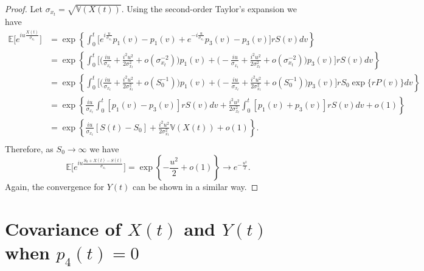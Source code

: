 \documentclass[10pt]{article}
\newcommand{\Var}{\mathbb{V}}
\newcommand{\EE}{\mathbb{E}}
\begin{document}
\begin{proof}
Let $\sigma_{x_t} = \sqrt{\Var(X(t))}$. Using the second-order Taylor's expansion we have
\begin{equation*}
\begin{split}
\EE \Big[e^{iu \frac{X(t)}{\sigma_{x_t}}} \Big] &= \exp \left\{  \int_0^t \Big[ e^{i \frac{u}{\sigma_{x_t}}}p_1(v) - p_1(v) + e^{-i \frac{u}{\sigma_{x_t}}}p_3(v) - p_3(v)\Big] r S(v) dv\right\} \\
& = \exp \left\{ \int_0^t \Big[ \Big( \frac{iu}{\sigma_{x_t}} + \frac{i^2 u^2}{2 \sigma^2_{x_t}} + o\left(\sigma^{-2}_{x_t}\right) \Big) p_1(v) +  \Big(- \frac{iu}{\sigma_{x_t}} + \frac{i^2 u^2}{2 \sigma^2_{x_t}} + o\left(\sigma^{-2}_{x_t}\right) \Big) p_3(v)  \Big] r S(v) dv\right\} \\
& = \exp \left\{ \int_0^t \Big[ \Big( \frac{iu}{\sigma_{x_t}} + \frac{i^2 u^2}{2 \sigma^2_{x_t}} + o\left(S_0^{-1}\right) \Big) p_1(v) +  \Big(- \frac{iu}{\sigma_{x_t}} + \frac{i^2 u^2}{2 \sigma^2_{x_t}} + o\left(S_0^{-1}\right) \Big) p_3(v)  \Big] r S_0\exp\{r P(v)\} dv\right\} \\
& = \exp \left\{ \frac{iu}{\sigma_{x_t}} \int_0^t  [p_1(v) - p_3(v)] r S(v) dv + \frac{i^2u^2}{2\sigma^2_{x_t}}\int_0^t  [p_1(v) + p_3(v)] r S(v) dv  +  o (1) \right\} \\
& = \exp \left\{ \frac{iu}{\sigma_{x_t}} [S(t)-S_0] + \frac{i^2u^2}{2\sigma^2_{x_t}}\Var(X(t)) +  o (1)\right\}. \\
\end{split}
\end{equation*}
Therefore, as $S_0\to \infty$ we have
$$
\EE\Big[ e^{iu \frac{S_0+X(t)-S(t)} {\sigma_{x_t}}} \Big]= \exp \left\{ -\frac{u^2}{2} +  o (1)\right\} \rightarrow e^{- \frac{u^2}{2 }}.
$$
Again, the convergence for $Y(t)$ can be shown in a similar way.
\end{proof}

\section{Covariance of $X(t)$ and $Y(t)$ when $p_4(t) = 0$}
\end{document}
